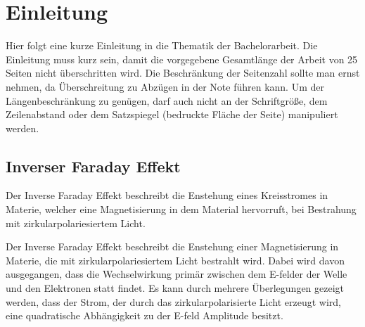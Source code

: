 \chapter{Einleitung}
Hier folgt eine kurze Einleitung in die Thematik der Bachelorarbeit.
Die Einleitung muss kurz sein, damit die vorgegebene Gesamtlänge der
Arbeit von 25 Seiten nicht überschritten wird.
Die Beschränkung der Seitenzahl sollte man ernst nehmen,
da Überschreitung zu Abzügen in der Note führen kann.
Um der Längenbeschränkung zu genügen, darf auch nicht an der Schriftgröße,
dem Zeilenabstand oder dem Satzspiegel (bedruckte Fläche der Seite) manipuliert werden.





\section{Inverser Faraday Effekt}
Der Inverse Faraday Effekt beschreibt die Enstehung eines Kreisstromes in Materie, welcher
eine Magnetisierung in dem Material hervorruft, bei Bestrahung mit zirkularpolariesiertem Licht.

Der Inverse Faraday Effekt beschreibt die Enstehung einer Magnetisierung in Materie, die mit zirkularpolariesiertem Licht bestrahlt wird.
Dabei wird davon ausgegangen, dass die Wechselwirkung primär zwischen dem E-felder der Welle und den Elektronen statt findet.
Es kann durch mehrere Überlegungen gezeigt werden, dass der Strom, der durch das zirkularpolarisierte Licht erzeugt wird, eine quadratische Abhängigkeit
zu der E-feld Amplitude besitzt.
